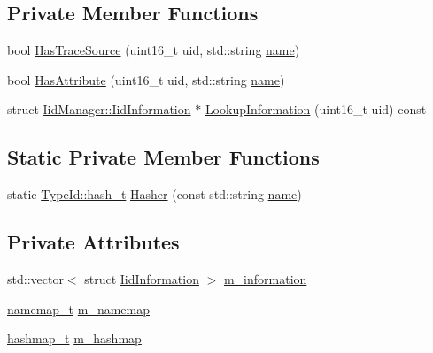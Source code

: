 \subsection*{Private Member Functions}
\begin{DoxyCompactItemize}
\item 
bool \hyperlink{classns3_1_1IidManager_a485d3d45a86d50e35c464672db397734}{Has\+Trace\+Source} (uint16\+\_\+t uid, std\+::string \hyperlink{generate__test__data__lte__spectrum__model_8m_ab74e6bf80237ddc4109968cedc58c151}{name})
\item 
bool \hyperlink{classns3_1_1IidManager_aa6ce275dd09bdd19ea6eb3373b4ccc98}{Has\+Attribute} (uint16\+\_\+t uid, std\+::string \hyperlink{generate__test__data__lte__spectrum__model_8m_ab74e6bf80237ddc4109968cedc58c151}{name})
\item 
struct \hyperlink{structns3_1_1IidManager_1_1IidInformation}{Iid\+Manager\+::\+Iid\+Information} $\ast$ \hyperlink{classns3_1_1IidManager_a6b1f4ba2815dba27a377e8a8db2384cf}{Lookup\+Information} (uint16\+\_\+t uid) const 
\end{DoxyCompactItemize}
\subsection*{Static Private Member Functions}
\begin{DoxyCompactItemize}
\item 
static \hyperlink{classns3_1_1TypeId_ab3fc1475c4a0c2cfb35b976dbd609057}{Type\+Id\+::hash\+\_\+t} \hyperlink{classns3_1_1IidManager_ac125cec331e0a7f55910e96aecec2091}{Hasher} (const std\+::string \hyperlink{generate__test__data__lte__spectrum__model_8m_ab74e6bf80237ddc4109968cedc58c151}{name})
\end{DoxyCompactItemize}
\subsection*{Private Attributes}
\begin{DoxyCompactItemize}
\item 
std\+::vector$<$ struct \hyperlink{structns3_1_1IidManager_1_1IidInformation}{Iid\+Information} $>$ \hyperlink{classns3_1_1IidManager_a70a768fafd827135a13cd6e613e9c78e}{m\+\_\+information}
\item 
\hyperlink{classns3_1_1IidManager_a2b13b1c19ecc94df463fc2edf522655e}{namemap\+\_\+t} \hyperlink{classns3_1_1IidManager_aff98d5f56a6128126bd28261363472ca}{m\+\_\+namemap}
\item 
\hyperlink{classns3_1_1IidManager_a18fb4e9506aba477e14ad7dd367dbb29}{hashmap\+\_\+t} \hyperlink{classns3_1_1IidManager_ac86e0322a1b399335032df212d9675ab}{m\+\_\+hashmap}
\end{DoxyCompactItemize}
